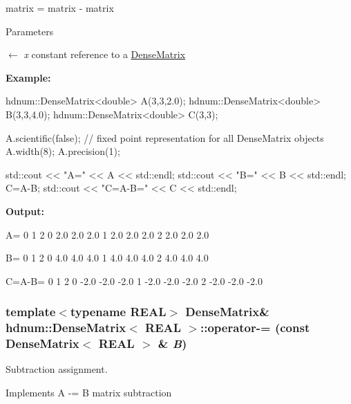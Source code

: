 matrix = matrix -\/ matrix 


\begin{DoxyParams}{Parameters}
\item[\mbox{$\leftarrow$} {\em x}]constant reference to a \hyperlink{classhdnum_1_1DenseMatrix}{DenseMatrix}\end{DoxyParams}
{\bfseries Example:} 
\begin{DoxyCode}
  hdnum::DenseMatrix<double> A(3,3,2.0);
  hdnum::DenseMatrix<double> B(3,3,4.0);
  hdnum::DenseMatrix<double> C(3,3);

  A.scientific(false); // fixed point representation for all DenseMatrix objects
  A.width(8);
  A.precision(1);

  std::cout << "A=" << A << std::endl;
  std::cout << "B=" << B << std::endl;
  C=A-B;
  std::cout << "C=A-B=" << C << std::endl;
\end{DoxyCode}


{\bfseries Output:} \begin{DoxyVerb}
A=
                    0        1        2 
          0       2.0      2.0      2.0 
          1       2.0      2.0      2.0 
          2       2.0      2.0      2.0 

B=
                    0        1        2 
          0       4.0      4.0      4.0 
          1       4.0      4.0      4.0 
          2       4.0      4.0      4.0 

C=A-B=
                    0        1        2 
          0      -2.0     -2.0     -2.0 
          1      -2.0     -2.0     -2.0 
          2      -2.0     -2.0     -2.0 
	  \end{DoxyVerb}
 \hypertarget{classhdnum_1_1DenseMatrix_a4b0031fef6e91b5f319862f16457ac9f}{
\subsubsection[{operator-\/=}]{\setlength{\rightskip}{0pt plus 5cm}template$<$typename REAL$>$ {\bf DenseMatrix}\& {\bf hdnum::DenseMatrix}$<$ REAL $>$::operator-\/= (const {\bf DenseMatrix}$<$ REAL $>$ \& {\em B})}}
\label{classhdnum_1_1DenseMatrix_a4b0031fef6e91b5f319862f16457ac9f}


Subtraction assignment. 

Implements A -\/= B matrix subtraction


